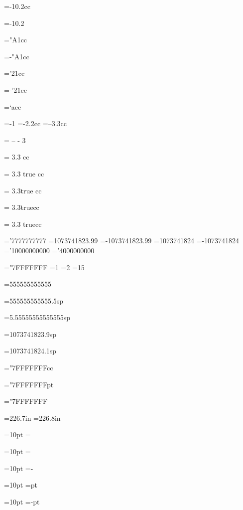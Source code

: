 =-10.2cc
\showthe{}

=-10.2
\showthe{}

="A1cc
\showthe{}

=-"A1cc
\showthe{}

='21cc
\showthe{}

=-'21cc
\showthe{}

=`acc
\showthe{}

=-1
\showthe{}
=-2.2cc
\showthe{}
=--3.3cc
\showthe{}

  =  -- - 3  
\showthe{}

 = 3.3  cc
\showthe{}

 = 3.3 true cc
\showthe{}

 = 3.3true cc
\showthe{}

 = 3.3truecc
\showthe{}

 = 3.3 truecc
\showthe{}

='7777777777
\showthe{}
=1073741823.99
\showthe{}
=-1073741823.99
\showthe{}
=1073741824
\showthe{}
=-1073741824
\showthe{}
='10000000000
\showthe{}
='4000000000
\showthe{}

="7FFFFFFF
=1
\showthe{}
=2
\showthe{}
=15
\showthe{}

=555555555555
\showthe{}

=555555555555.5sp
\showthe{}

=5.55555555555555sp
\showthe{}

=1073741823.9sp
\showthe{}

=1073741824.1sp
\showthe{}

="7FFFFFFFcc
\showthe{}

="7FFFFFFFpt
\showthe{}

="7FFFFFFF
\showthe{}

=226.7in
\showthe{}
=226.8in
\showthe{}

=10pt
=\relax\relax
\showthe{}

=10pt
=\relax
\showthe{}

=10pt
=-\relax
\showthe{}

=10pt
=pt
\showthe{}

=10pt
=-pt
\showthe{}







